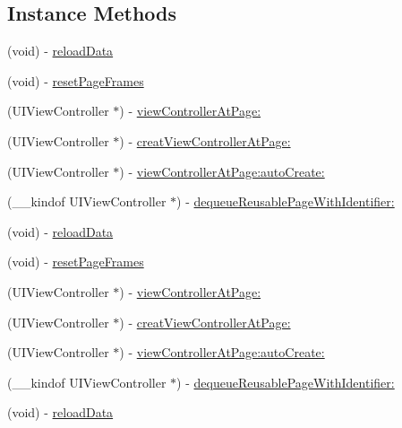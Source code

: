 \subsection*{Instance Methods}
\begin{DoxyCompactItemize}
\item 
(void) -\/ \mbox{\hyperlink{interface_v_t_content_view_a149d0671851947b882cf5f13e11f8964}{reload\+Data}}
\item 
(void) -\/ \mbox{\hyperlink{interface_v_t_content_view_aaf3cbce1763c957d35ebd7e44fb08abf}{reset\+Page\+Frames}}
\item 
(U\+I\+View\+Controller $\ast$) -\/ \mbox{\hyperlink{interface_v_t_content_view_ae81362c80f8f700ad3c69d814da4ca9b}{view\+Controller\+At\+Page\+:}}
\item 
(U\+I\+View\+Controller $\ast$) -\/ \mbox{\hyperlink{interface_v_t_content_view_a40b4f2a5c2a8d8ff7f2ba3ef4e8e9600}{creat\+View\+Controller\+At\+Page\+:}}
\item 
(U\+I\+View\+Controller $\ast$) -\/ \mbox{\hyperlink{interface_v_t_content_view_a688090ca86d8df39124c8720eb72e496}{view\+Controller\+At\+Page\+:auto\+Create\+:}}
\item 
(\+\_\+\+\_\+kindof U\+I\+View\+Controller $\ast$) -\/ \mbox{\hyperlink{interface_v_t_content_view_a79bbce699a927322b460d949b1f16262}{dequeue\+Reusable\+Page\+With\+Identifier\+:}}
\item 
(void) -\/ \mbox{\hyperlink{interface_v_t_content_view_a149d0671851947b882cf5f13e11f8964}{reload\+Data}}
\item 
(void) -\/ \mbox{\hyperlink{interface_v_t_content_view_aaf3cbce1763c957d35ebd7e44fb08abf}{reset\+Page\+Frames}}
\item 
(U\+I\+View\+Controller $\ast$) -\/ \mbox{\hyperlink{interface_v_t_content_view_ae81362c80f8f700ad3c69d814da4ca9b}{view\+Controller\+At\+Page\+:}}
\item 
(U\+I\+View\+Controller $\ast$) -\/ \mbox{\hyperlink{interface_v_t_content_view_a40b4f2a5c2a8d8ff7f2ba3ef4e8e9600}{creat\+View\+Controller\+At\+Page\+:}}
\item 
(U\+I\+View\+Controller $\ast$) -\/ \mbox{\hyperlink{interface_v_t_content_view_a688090ca86d8df39124c8720eb72e496}{view\+Controller\+At\+Page\+:auto\+Create\+:}}
\item 
(\+\_\+\+\_\+kindof U\+I\+View\+Controller $\ast$) -\/ \mbox{\hyperlink{interface_v_t_content_view_a81541fa49650eb0f8aa1ddca90798247}{dequeue\+Reusable\+Page\+With\+Identifier\+:}}
\item 
(void) -\/ \mbox{\hyperlink{interface_v_t_content_view_a149d0671851947b882cf5f13e11f8964}{reload\+Data}}

\end{DoxyCompactItemize}
